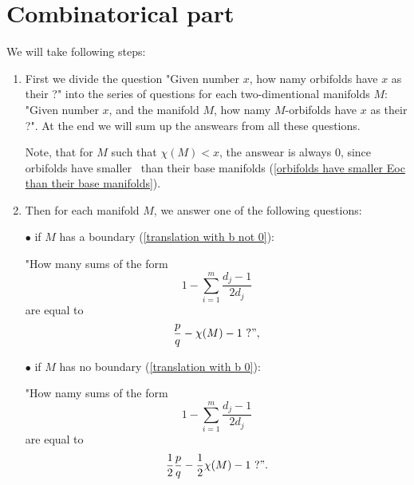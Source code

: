 \section{Combinatorical part}\label{combinatorical part}
We will take following steps:
\begin{enumerate}
\item First we divide the question "Given number $x$, how namy orbifolds have $x$ as their \Eoc?" 
into the series of questions 
for each two-dimentional manifolds $M$:
"Given number $x$, and the manifold $M$, how namy $M$-orbifolds have $x$ as their \Eoc?". 
At the end we will sum up the answears from all these questions. 

Note, that for $M$ such that $\chi(M) < x$, the answear is always $0$, since 
orbifolds have smaller \Eoc\ than their base manifolds 
(\ref{orbifolds have smaller Eoc than their base manifolds}).
\item Then for each manifold $M$, we answer one of the following questions: 

$\bullet$ if $M$ has a boundary (\ref{translation with b not 0}): 

"How many sums of the form 
\begin{equation}
1-\sum_{i=1}^m \frac{d_j-1}{2d_j} 
\end{equation}
are equal to 
\begin{equation}
\frac{p}{q} - \chi(M) - 1 \ ?", 
\end{equation}




$\bullet$ if $M$ has no boundary (\ref{translation with b 0}): 

"How namy sums of the form
\begin{equation}
1-\sum_{i=1}^m \frac{d_j-1}{2d_j} 
\end{equation}
are equal to 
\begin{equation}
\frac{1}{2}\frac{p}{q} - \frac{1}{2}\chi(M) -1\ ?".
\end{equation}


\end{enumerate}
